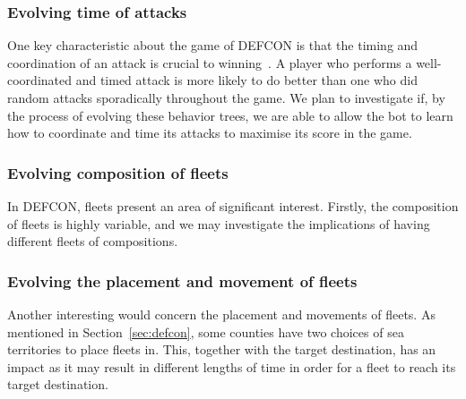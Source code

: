         \subsubsection{Evolving time of attacks}
        One key characteristic about the game of DEFCON is that the timing and coordination of an attack is crucial to winning~\cite{robbot}. A player who performs a well-coordinated and timed attack is more likely to do better than one who did random attacks sporadically throughout the game. We plan to investigate if, by the process of evolving these behavior trees, we are able to allow the bot to learn how to coordinate and time its attacks to maximise its score in the game. 
         
        \subsubsection{Evolving composition of fleets}
        In DEFCON, fleets present an area of significant interest. Firstly, the composition of fleets is highly variable, and we may investigate the implications of having different fleets of compositions. 

        \subsubsection{Evolving the placement and movement of fleets}
        Another interesting would concern the placement and movements of fleets. As mentioned in Section~\ref{sec:defcon}, some counties have two choices of sea territories to place fleets in. This, together with the target destination, has an impact as it may result in different lengths of time in order for a fleet to reach its target destination.
